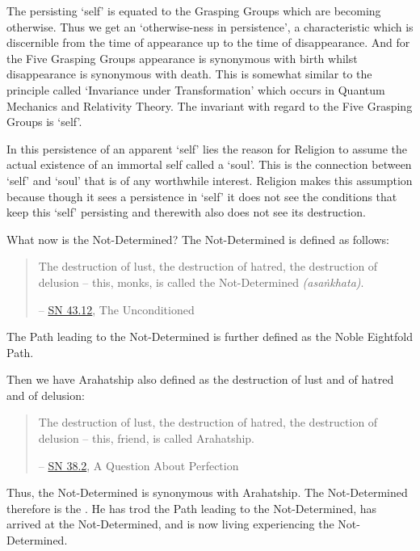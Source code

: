 The persisting `self' is equated to the Grasping Groups which are becoming otherwise. Thus we get an `otherwise-ness in persistence', a characteristic which is discernible from the time of appearance up to the time of disappearance. And for the Five Grasping Groups appearance is synonymous with birth whilst disappearance is synonymous with death. This is somewhat similar to the principle called `Invariance under Transformation' which occurs in Quantum Mechanics and Relativity Theory. The invariant with regard to the Five Grasping Groups is `self'.

In this persistence of an apparent `self' lies the reason for Religion to assume the actual existence of an immortal self called a `soul'. This is the connection between `self' and `soul' that is of any worthwhile interest. Religion makes this assumption because though it sees a persistence in `self' it does not see the conditions that keep this `self' persisting and therewith also does not see its destruction.

\clearpage

What now is the Not-Determined? The Not-Determined is defined as follows:

\begin{quote}
The destruction of lust, the destruction of hatred, the destruction of delusion -- this, monks, is called the Not-Determined \emph{(asaṅkhata)}.

 -- \href{https://suttacentral.net/sn43.12/en/bodhi}{SN 43.12}, The Unconditioned
\end{quote}

The Path leading to the Not-Determined is further defined as the Noble Eightfold Path.

Then we have Arahatship also defined as the destruction of lust and of hatred and of delusion:

\begin{quote}
The destruction of lust, the destruction of hatred, the destruction of delusion -- this, friend, is called Arahatship.

 -- \href{https://suttacentral.net/sn38.2/en/sujato}{SN 38.2}, A Question About Perfection
\end{quote}

\label{ch-08-living-experience}Thus, the Not-Determined is synonymous with Arahatship. The Not-Determined therefore is the . He has trod the Path leading to the Not-Determined, has arrived at the Not-Determined, and is now living experiencing the Not-Determined.

